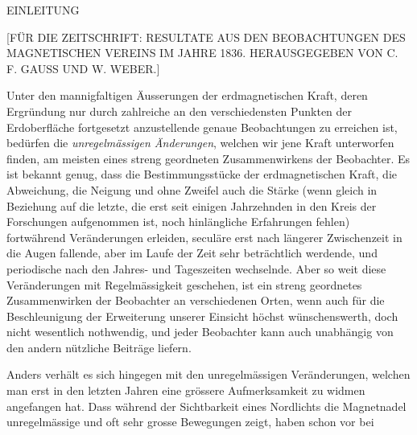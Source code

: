 \clearpage
{}
\begin{center}
{\Large EINLEITUNG}\par\medskip
{\small [FÜR DIE ZEITSCHRIFT: RESULTATE AUS DEN BEOBACHTUNGEN DES MAGNETISCHEN VEREINS IM JAHRE 1836. HERAUSGEGEBEN VON C. F. GAUSS UND W. WEBER.]}
\end{center}
\medskip
Unter den mannigfaltigen Äusserungen der erdmagnetischen Kraft, deren Ergründung nur durch zahlreiche an den verschiedensten Punkten der Erdoberfläche fortgesetzt anzustellende genaue Beobachtungen zu erreichen ist, bedürfen die \textit{unregelmässigen Änderungen}, welchen wir jene Kraft unterworfen finden, am meisten eines streng geordneten Zusammenwirkens der Beobachter. Es ist bekannt genug, dass die Bestimmungsstücke der erdmagnetischen Kraft, die Abweichung, die Neigung und ohne Zweifel auch die Stärke (wenn gleich in Beziehung auf die letzte, die erst seit einigen Jahrzehnden in den Kreis der Forschungen aufgenommen ist, noch hinlängliche Erfahrungen fehlen) fortwährend Veränderungen erleiden, seculäre erst nach längerer Zwischenzeit in die Augen fallende, aber im Laufe der Zeit sehr beträchtlich werdende, und periodische nach den Jahres- und Tageszeiten wechselnde. Aber so weit diese Veränderungen mit Regelmässigkeit geschehen, ist ein streng geordnetes Zusammenwirken der Beobachter an verschiedenen Orten, wenn auch für die Beschleunigung der Erweiterung unserer Einsicht höchst wünschenswerth, doch nicht wesentlich nothwendig, und jeder Beobachter kann auch unabhängig von den andern nützliche Beiträge liefern.

Anders verhält es sich hingegen mit den unregelmässigen Veränderungen, welchen man erst in den letzten Jahren eine grössere Aufmerksamkeit zu widmen angefangen hat. Dass während der Sichtbarkeit eines Nordlichts die Magnetnadel unregelmässige und oft sehr grosse Bewegungen zeigt, haben schon vor bei%
